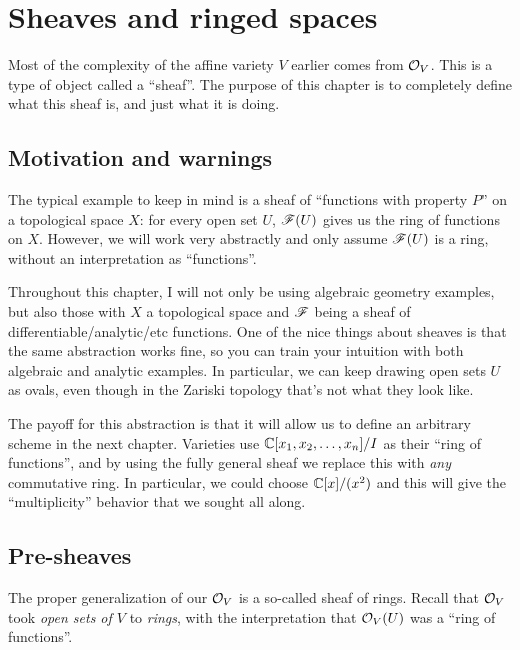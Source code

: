 \chapter{Sheaves and ringed spaces}
Most of the complexity of the affine variety $V$ earlier comes from $\mathcal O_V$.
This is a type of object called a ``sheaf''.
The purpose of this chapter is to completely define what this sheaf is,
and just what it is doing.

\section{Motivation and warnings}
The typical example to keep in mind is a sheaf of
``functions with property $P$'' on a topological space $X$:
for every open set $U$, $\mathscr F(U)$ gives us the ring of functions on $X$.
However, we will work very abstractly and only assume $\mathscr F(U)$
is a ring, without an interpretation as ``functions''.

Throughout this chapter, I will not only be using algebraic geometry
examples, but also those with $X$ a topological space
and $\mathscr F$ being a sheaf of differentiable/analytic/etc functions.
One of the nice things about sheaves is that the same abstraction works fine,
so you can train your intuition with both algebraic and analytic examples.
In particular, we can keep drawing open sets $U$ as ovals,
even though in the Zariski topology that's not what they look like.

The payoff for this abstraction is that it will
allow us to define an arbitrary scheme in the next chapter.
Varieties use $\mathbb C[x_1, x_2, \dots, x_n] / I$ as their ``ring of functions'',
and by using the fully general sheaf we replace this
with \emph{any} commutative ring.
In particular, we could choose $\mathbb C[x] / (x^2)$
and this will give the ``multiplicity''
behavior that we sought all along.


\section{Pre-sheaves}

The proper generalization of our $\mathcal O_V$ is a so-called sheaf of rings.
Recall that $\mathcal O_V$ took \emph{open sets of $V$} to \emph{rings},
with the interpretation that $\mathcal O_V(U)$ was a ``ring of functions''.


